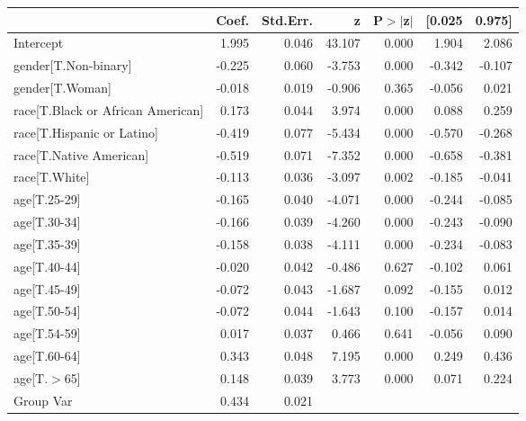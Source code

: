 \begin{table}
\begin{center}
\begin{tabular}{lrrrrrr}
\hline
                                  &  Coef. & Std.Err. &      z & P$> |$z$|$ & [0.025 & 0.975]  \\
\hline
Intercept                         &  1.995 &    0.046 & 43.107 &       0.000 &  1.904 &  2.086  \\
gender[T.Non-binary]              & -0.225 &    0.060 & -3.753 &       0.000 & -0.342 & -0.107  \\
gender[T.Woman]                   & -0.018 &    0.019 & -0.906 &       0.365 & -0.056 &  0.021  \\
race[T.Black or African American] &  0.173 &    0.044 &  3.974 &       0.000 &  0.088 &  0.259  \\
race[T.Hispanic or Latino]        & -0.419 &    0.077 & -5.434 &       0.000 & -0.570 & -0.268  \\
race[T.Native American]           & -0.519 &    0.071 & -7.352 &       0.000 & -0.658 & -0.381  \\
race[T.White]                     & -0.113 &    0.036 & -3.097 &       0.002 & -0.185 & -0.041  \\
age[T.25-29]                      & -0.165 &    0.040 & -4.071 &       0.000 & -0.244 & -0.085  \\
age[T.30-34]                      & -0.166 &    0.039 & -4.260 &       0.000 & -0.243 & -0.090  \\
age[T.35-39]                      & -0.158 &    0.038 & -4.111 &       0.000 & -0.234 & -0.083  \\
age[T.40-44]                      & -0.020 &    0.042 & -0.486 &       0.627 & -0.102 &  0.061  \\
age[T.45-49]                      & -0.072 &    0.043 & -1.687 &       0.092 & -0.155 &  0.012  \\
age[T.50-54]                      & -0.072 &    0.044 & -1.643 &       0.100 & -0.157 &  0.014  \\
age[T.54-59]                      &  0.017 &    0.037 &  0.466 &       0.641 & -0.056 &  0.090  \\
age[T.60-64]                      &  0.343 &    0.048 &  7.195 &       0.000 &  0.249 &  0.436  \\
age[T.$>$65]                      &  0.148 &    0.039 &  3.773 &       0.000 &  0.071 &  0.224  \\
Group Var                         &  0.434 &    0.021 &        &             &        &         \\
\hline
\end{tabular}
\end{center}
\end{table}



